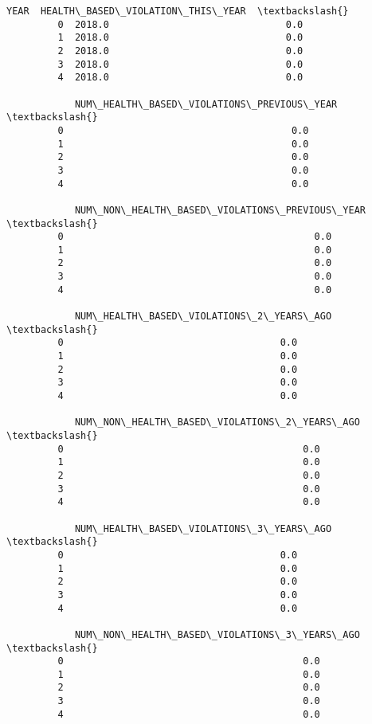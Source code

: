 \documentclass[11pt]{article}
\begin{document}
\begin{Verbatim}[commandchars=\\\{\}]
              YEAR  HEALTH\_BASED\_VIOLATION\_THIS\_YEAR  \textbackslash{}
         0  2018.0                               0.0   
         1  2018.0                               0.0   
         2  2018.0                               0.0   
         3  2018.0                               0.0   
         4  2018.0                               0.0   
         
            NUM\_HEALTH\_BASED\_VIOLATIONS\_PREVIOUS\_YEAR  \textbackslash{}
         0                                        0.0   
         1                                        0.0   
         2                                        0.0   
         3                                        0.0   
         4                                        0.0   
         
            NUM\_NON\_HEALTH\_BASED\_VIOLATIONS\_PREVIOUS\_YEAR  \textbackslash{}
         0                                            0.0   
         1                                            0.0   
         2                                            0.0   
         3                                            0.0   
         4                                            0.0   
         
            NUM\_HEALTH\_BASED\_VIOLATIONS\_2\_YEARS\_AGO  \textbackslash{}
         0                                      0.0   
         1                                      0.0   
         2                                      0.0   
         3                                      0.0   
         4                                      0.0   
         
            NUM\_NON\_HEALTH\_BASED\_VIOLATIONS\_2\_YEARS\_AGO  \textbackslash{}
         0                                          0.0   
         1                                          0.0   
         2                                          0.0   
         3                                          0.0   
         4                                          0.0   
         
            NUM\_HEALTH\_BASED\_VIOLATIONS\_3\_YEARS\_AGO  \textbackslash{}
         0                                      0.0   
         1                                      0.0   
         2                                      0.0   
         3                                      0.0   
         4                                      0.0   
         
            NUM\_NON\_HEALTH\_BASED\_VIOLATIONS\_3\_YEARS\_AGO  \textbackslash{}
         0                                          0.0   
         1                                          0.0   
         2                                          0.0   
         3                                          0.0   
         4                                          0.0   
         

\end{Verbatim}
\end{document}
